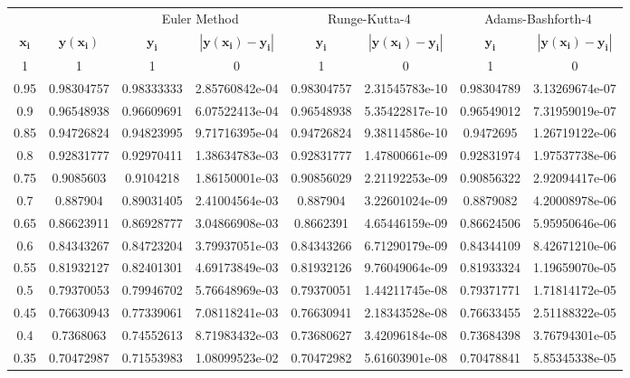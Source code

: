 \documentclass[
  course = {{16-811 Math Fundamentals for Robotics}},
  quartile = {{1}},
  assignment = 4,
  name = {{Kangle Deng}},
  email = {{kangled@andrew.cmu.edu}},
  firstexercise = 1
]{aga-homework}
\begin{document}
\begin{table}[h]
  \begin{center}
  \scriptsize{
    \begin{tabular}{c|c|cc|cc|cc}
      \toprule
      & & \multicolumn{2}{c}{Euler Method} & \multicolumn{2}{c}{Runge-Kutta-4} & \multicolumn{2}{c}{Adams-Bashforth-4} \\
     $\mathbf{x_i}$ & $\mathbf{y(x_i)}$ & $\mathbf{y_i}$ & $\mathbf{|y(x_i) - y_i|}$ & $\mathbf{y_i}$ & $\mathbf{|y(x_i) - y_i|}$ & $\mathbf{y_i}$ & $\mathbf{|y(x_i) - y_i|}$ \\
      \midrule
    1 & 1 & 1 & 0 & 1 & 0 & 1 & 0\\
    0.95 & 0.98304757 & 0.98333333 & 2.85760842e-04 & 0.98304757 & 2.31545783e-10 & 0.98304789 & 3.13269674e-07\\
    0.9 & 0.96548938 & 0.96609691 & 6.07522413e-04 & 0.96548938 & 5.35422817e-10 & 0.96549012 & 7.31959019e-07\\
    0.85 & 0.94726824 & 0.94823995 & 9.71716395e-04 & 0.94726824 & 9.38114586e-10 & 0.9472695 & 1.26719122e-06\\
    0.8  & 0.92831777 & 0.92970411 & 1.38634783e-03 & 0.92831777 & 1.47800661e-09 & 0.92831974 & 1.97537738e-06\\
    0.75 & 0.9085603 & 0.9104218 & 1.86150001e-03 & 0.90856029 & 2.21192253e-09 & 0.90856322 & 2.92094417e-06\\
    0.7 &  0.887904 &  0.89031405 & 2.41004564e-03 & 0.887904 & 3.22601024e-09 & 0.8879082 & 4.20008978e-06\\
    0.65 & 0.86623911 &  0.86928777 & 3.04866908e-03 & 0.8662391 & 4.65446159e-09 & 0.86624506 & 5.95950646e-06\\
    0.6 & 0.84343267 &  0.84723204 & 3.79937051e-03 & 0.84343266 & 6.71290179e-09 & 0.84344109 & 8.42671210e-06 \\
    0.55 & 0.81932127 & 0.82401301 & 4.69173849e-03 & 0.81932126 & 9.76049064e-09 & 0.81933324 &  1.19659070e-05\\
    0.5 &  0.79370053 & 0.79946702  & 5.76648969e-03 & 0.79370051 & 1.44211745e-08 & 0.79371771 & 1.71814172e-05\\
    0.45  & 0.76630943 & 0.77339061 & 7.08118241e-03 & 0.76630941 & 2.18343528e-08 & 0.76633455 &  2.51188322e-05\\
    0.4 &  0.7368063 & 0.74552613 & 8.71983432e-03 & 0.73680627 & 3.42096184e-08 & 0.73684398 & 3.76794301e-05\\
    0.35 & 0.70472987  & 0.71553983 & 1.08099523e-02 & 0.70472982 & 5.61603901e-08 & 0.70478841 & 5.85345338e-05\\

\end{tabular}}
\end{center}
\end{table}
\end{document}
